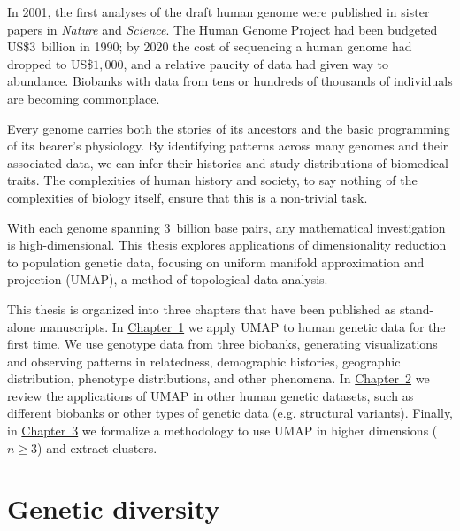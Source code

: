 %

In 2001, the first analyses of the draft human genome were published in sister papers in \textit{Nature} and \textit{Science}. The Human Genome Project had been budgeted US\$$3$~billion in 1990; by 2020 the cost of sequencing a human genome had dropped to US\$$1,000$, and a relative paucity of data had given way to abundance\citep{gibbs_human_2020}. Biobanks with data from tens or hundreds of thousands of individuals are becoming commonplace.

Every genome carries both the stories of its ancestors and the basic programming of its bearer's physiology. By identifying patterns across many genomes and their associated data, we can infer their histories and study distributions of biomedical traits. The complexities of human history and society, to say nothing of the complexities of biology itself, ensure that this is a non-trivial task.

With each genome spanning $3$~billion base pairs, any mathematical investigation is high-dimensional. This thesis explores applications of dimensionality reduction to population genetic data, focusing on uniform manifold approximation and projection (UMAP), a method of topological data analysis.

This thesis is organized into three chapters that have been published as stand-alone manuscripts. In \hyperref[chap:chapter1]{Chapter~1} we apply UMAP to human genetic data for the first time. We use genotype data from three biobanks, generating visualizations and observing patterns in relatedness, demographic histories, geographic distribution, phenotype distributions, and other phenomena. In \hyperref[chap:chapter2]{Chapter~2} we review the applications of UMAP in other human genetic datasets, such as different biobanks or other types of genetic data (e.g. structural variants). Finally, in \hyperref[chap:chapter3]{Chapter~3} we formalize a methodology to use UMAP in higher dimensions ($n \ge 3$) and extract clusters.


\section{Genetic diversity}

